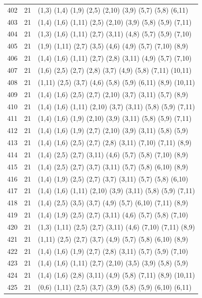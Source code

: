 {\begin{longtable}{lll}
402 & 21 & (1,3) (1,4) (1,9) (2,5) (2,10) (3,9) (5,7) (5,8) (6,11) \\
403 & 21 & (1,4) (1,6) (1,11) (2,5) (2,10) (3,9) (5,8) (5,9) (7,11) \\
404 & 21 & (1,3) (1,6) (1,11) (2,7) (3,11) (4,8) (5,7) (5,9) (7,10) \\
405 & 21 & (1,9) (1,11) (2,7) (3,5) (4,6) (4,9) (5,7) (7,10) (8,9) \\
406 & 21 & (1,4) (1,6) (1,11) (2,7) (2,8) (3,11) (4,9) (5,7) (7,10) \\
407 & 21 & (1,6) (2,5) (2,7) (2,8) (3,7) (4,9) (5,8) (7,11) (10,11) \\
408 & 21 & (1,11) (2,5) (3,7) (4,6) (5,8) (5,9) (6,11) (8,9) (10,11) \\
409 & 21 & (1,4) (1,6) (2,5) (2,7) (2,10) (3,7) (3,11) (5,7) (8,9) \\
410 & 21 & (1,4) (1,6) (1,11) (2,10) (3,7) (3,11) (5,8) (5,9) (7,11) \\
411 & 21 & (1,4) (1,6) (1,9) (2,10) (3,9) (3,11) (5,8) (5,9) (7,11) \\
412 & 21 & (1,4) (1,6) (1,9) (2,7) (2,10) (3,9) (3,11) (5,8) (5,9) \\
413 & 21 & (1,4) (1,6) (2,5) (2,7) (2,8) (3,11) (7,10) (7,11) (8,9) \\
414 & 21 & (1,4) (2,5) (2,7) (3,11) (4,6) (5,7) (5,8) (7,10) (8,9) \\
415 & 21 & (1,4) (2,5) (2,7) (3,7) (3,11) (5,7) (5,8) (6,10) (8,9) \\
416 & 21 & (1,4) (1,9) (2,5) (2,7) (3,7) (3,11) (5,7) (5,8) (6,10) \\
417 & 21 & (1,4) (1,6) (1,11) (2,10) (3,9) (3,11) (5,8) (5,9) (7,11) \\
418 & 21 & (1,4) (2,5) (3,5) (3,7) (4,9) (5,7) (6,10) (7,11) (8,9) \\
419 & 21 & (1,4) (1,9) (2,5) (2,7) (3,11) (4,6) (5,7) (5,8) (7,10) \\
420 & 21 & (1,3) (1,11) (2,5) (2,7) (3,11) (4,6) (7,10) (7,11) (8,9) \\
421 & 21 & (1,11) (2,5) (2,7) (3,7) (4,9) (5,7) (5,8) (6,10) (8,9) \\
422 & 21 & (1,4) (1,6) (1,9) (2,7) (2,8) (3,11) (5,7) (5,9) (7,10) \\
423 & 21 & (1,4) (1,6) (1,11) (2,7) (2,10) (3,5) (3,9) (5,8) (5,9) \\
424 & 21 & (1,4) (1,6) (2,8) (3,11) (4,9) (5,8) (7,11) (8,9) (10,11) \\
425 & 21 & (0,6) (1,11) (2,5) (3,7) (3,9) (5,8) (5,9) (6,10) (6,11) \\

\end{longtable}}

